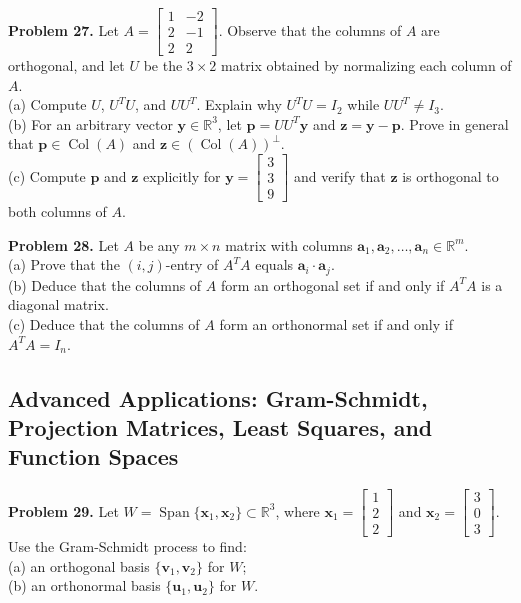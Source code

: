 \documentclass[11pt, letterpaper]{article}
\theoremstyle{definition}
\theoremstyle{remark}
\begin{document}
\textbf{Problem 27.} Let $A = \begin{bmatrix} 1 & -2 \\ 2 & -1 \\ 2 & 2 \end{bmatrix}$. Observe that the columns of $A$ are orthogonal, and let $U$ be the $3 \times 2$ matrix obtained by normalizing each column of $A$. \\
(a) Compute $U$, $U^T U$, and $U U^T$. Explain why $U^T U = I_2$ while $U U^T \neq I_3$. \\
(b) For an arbitrary vector $\mathbf{y} \in \mathbb{R}^3$, let $\mathbf{p} = U U^T \mathbf{y}$ and $\mathbf{z} = \mathbf{y} - \mathbf{p}$. Prove in general that $\mathbf{p} \in \operatorname{Col}(A)$ and $\mathbf{z} \in (\operatorname{Col}(A))^\perp$. \\
(c) Compute $\mathbf{p}$ and $\mathbf{z}$ explicitly for $\mathbf{y} = \begin{bmatrix} 3 \\ 3 \\ 9 \end{bmatrix}$ and verify that $\mathbf{z}$ is orthogonal to both columns of $A$.

\textbf{Problem 28.} Let $A$ be any $m \times n$ matrix with columns $\mathbf{a}_1, \mathbf{a}_2, \dots, \mathbf{a}_n \in \mathbb{R}^m$. \\
(a) Prove that the $(i, j)$-entry of $A^T A$ equals $\mathbf{a}_i \cdot \mathbf{a}_j$. \\
(b) Deduce that the columns of $A$ form an orthogonal set if and only if $A^T A$ is a diagonal matrix. \\
(c) Deduce that the columns of $A$ form an orthonormal set if and only if $A^T A = I_n$.

\subsection{Advanced Applications: Gram-Schmidt, Projection Matrices, Least Squares, and Function Spaces}

\textbf{Problem 29.} Let $W = \operatorname{Span}\{\mathbf{x}_1, \mathbf{x}_2\} \subset \mathbb{R}^3$, where $\mathbf{x}_1 = \begin{bmatrix} 1 \\ 2 \\ 2 \end{bmatrix}$ and $\mathbf{x}_2 = \begin{bmatrix} 3 \\ 0 \\ 3 \end{bmatrix}$. Use the Gram-Schmidt process to find: \\
(a) an orthogonal basis $\{\mathbf{v}_1, \mathbf{v}_2\}$ for $W$; \\
(b) an orthonormal basis $\{\mathbf{u}_1, \mathbf{u}_2\}$ for $W$.
\end{document}
